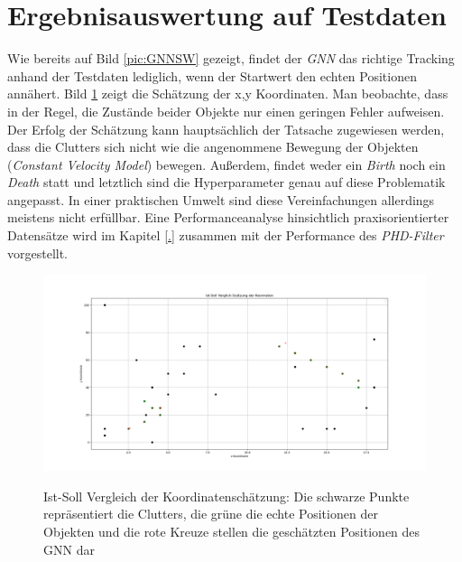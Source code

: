 \documentclass[10pt,a4paper]{article}
\begin{document}
\section{Ergebnisauswertung auf Testdaten}\label{sub:GNNEinflussParam}
Wie bereits auf Bild \ref{pic:GNNSW} gezeigt, findet der \textit{GNN} das richtige Tracking anhand der Testdaten lediglich, wenn der Startwert den echten Positionen annähert. Bild \ref{pic:GNNXY} zeigt die Schätzung der x,y Koordinaten. Man beobachte, dass in der Regel, die Zustände beider Objekte nur einen geringen Fehler aufweisen. Der Erfolg der Schätzung kann hauptsächlich der Tatsache zugewiesen werden, dass die Clutters sich nicht wie die angenommene Bewegung der Objekten (\textit{Constant Velocity Model}) bewegen. Außerdem, findet weder ein \textit{Birth} noch ein \textit{Death} statt und letztlich sind die Hyperparameter genau auf diese Problematik angepasst. In einer praktischen Umwelt sind diese Vereinfachungen allerdings meistens nicht erfüllbar. Eine Performanceanalyse hinsichtlich praxisorientierter Datensätze wird im Kapitel \ref{.} zusammen mit der Performance des \textit{PHD-Filter} vorgestellt.  \\
\begin{figure}[h!]
\begin{center}
\includegraphics[width=12 cm]{./Pictures_report/GNNTestdatenXY}\label{ConvexConcave}
\caption{Ist-Soll Vergleich der Koordinatenschätzung: Die schwarze Punkte repräsentiert die Clutters, die grüne die echte Positionen der Objekten und die rote Kreuze stellen die geschätzten Positionen des GNN dar}
\label{pic:GNNXY}
\end{center}
\end{figure}
\end{document}
